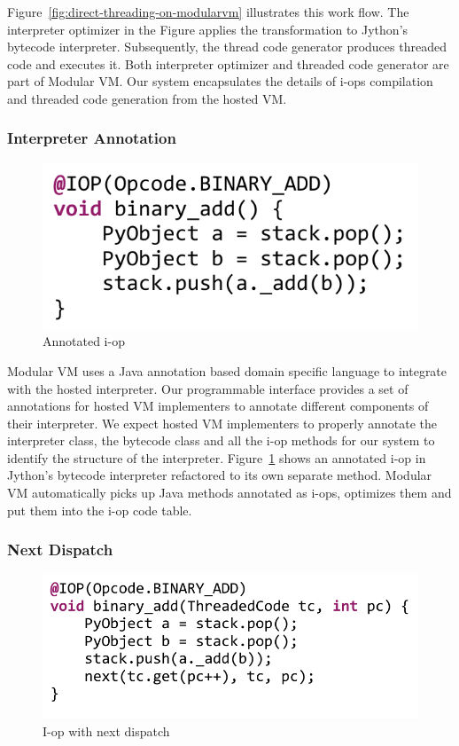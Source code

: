 Figure~\ref{fig:direct-threading-on-modularvm} illustrates this work flow.
The interpreter optimizer in the Figure applies the transformation to Jython's bytecode interpreter.
Subsequently, the thread code generator produces threaded code and executes it.
Both interpreter optimizer and threaded code generator are part of Modular VM.
Our system encapsulates the details of i-ops compilation and threaded code generation from the hosted VM.

\subsubsection{Interpreter Annotation}

\begin{figure}[ht]
\centering
\includegraphics[scale=.65]{figures/ch2-annotated-iop-code.pdf}
\caption{Annotated i-op}
\label{fig:annotated-iop}
\end{figure}

Modular VM uses a Java annotation based domain specific language to integrate with the hosted interpreter.
Our programmable interface provides a set of annotations for hosted VM implementers to annotate different components of their interpreter.
We expect hosted VM implementers to properly annotate the interpreter class, the bytecode class and all the i-op methods for our system to identify the structure of the interpreter.
Figure~\ref{fig:annotated-iop} shows an annotated i-op in Jython's bytecode interpreter refactored to its own separate method.
Modular VM automatically picks up Java methods annotated as i-ops, optimizes them and put them into the i-op code table.

\subsubsection{Next Dispatch}

\begin{figure}[ht]
\centering
\includegraphics[scale=.65]{figures/ch2-iop-with-next-code.pdf}
\caption{I-op with next dispatch}
\label{fig:iop-with-next}
\end{figure}

